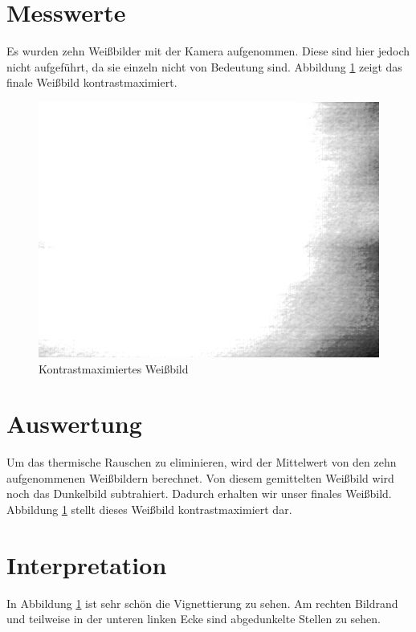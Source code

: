 \documentclass[12pt,oneside,a4paper]{report}
\begin{document}
\section{Messwerte}
\label{chap:VERSUCH_3_MESSWERTE}

Es wurden zehn Weißbilder mit der Kamera aufgenommen. Diese sind hier jedoch nicht aufgeführt, da sie einzeln nicht von Bedeutung sind.
Abbildung \ref{fig:WEISSBILD} zeigt das finale Weißbild kontrastmaximiert.
 
\begin{figure}
\centering\small
\includegraphics[scale=0.6]{src/WeissbildContrastMax.png}
\caption{Kontrastmaximiertes Weißbild}
\label{fig:WEISSBILD}
\end{figure}

\section{Auswertung}
\label{chap:VERSUCH_3_AUSWERTUNG}

Um das thermische Rauschen zu eliminieren, wird der Mittelwert von den zehn aufgenommenen Weißbildern berechnet. Von diesem gemittelten Weißbild wird noch das Dunkelbild subtrahiert.
Dadurch erhalten wir unser finales Weißbild. Abbildung \ref{fig:WEISSBILD} stellt dieses Weißbild kontrastmaximiert dar.

\section{Interpretation}
\label{chap:VERSUCH_3_INTERPRETATION}

In Abbildung \ref{fig:WEISSBILD} ist sehr schön die Vignettierung zu sehen. Am rechten Bildrand und teilweise in der unteren linken Ecke sind abgedunkelte Stellen zu sehen.
%
%
\end{document}

